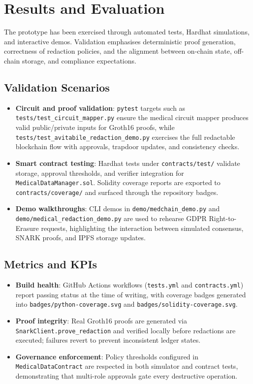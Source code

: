 \section{Results and Evaluation}

The prototype has been exercised through automated tests, Hardhat simulations, and interactive demos. Validation emphasises deterministic proof generation, correctness of redaction policies, and the alignment between on-chain state, off-chain storage, and compliance expectations.

\subsection{Validation Scenarios}
\begin{itemize}
    \item \textbf{Circuit and proof validation}: \texttt{pytest} targets such as \texttt{tests/test\_circuit\_mapper.py} ensure the medical circuit mapper produces valid public/private inputs for Groth16 proofs, while \texttt{tests/test\_avitabile\_redaction\_demo.py} exercises the full redactable blockchain flow with approvals, trapdoor updates, and consistency checks.
    \item \textbf{Smart contract testing}: Hardhat tests under \texttt{contracts/test/} validate storage, approval thresholds, and verifier integration for \texttt{MedicalDataManager.sol}. Solidity coverage reports are exported to \texttt{contracts/coverage/} and surfaced through the repository badges.
    \item \textbf{Demo walkthroughs}: CLI demos in \texttt{demo/medchain\_demo.py} and \texttt{demo/medical\_redaction\_demo.py} are used to rehearse GDPR Right-to-Erasure requests, highlighting the interaction between simulated consensus, SNARK proofs, and IPFS storage updates.
\end{itemize}

\subsection{Metrics and KPIs}
\begin{itemize}
    \item \textbf{Build health}: GitHub Actions workflows (\texttt{tests.yml} and \texttt{contracts.yml}) report passing status at the time of writing, with coverage badges generated into \texttt{badges/python-coverage.svg} and \texttt{badges/solidity-coverage.svg}.
    \item \textbf{Proof integrity}: Real Groth16 proofs are generated via \texttt{SnarkClient.prove\_redaction} and verified locally before redactions are executed; failures revert to prevent inconsistent ledger states.
    \item \textbf{Governance enforcement}: Policy thresholds configured in \texttt{MedicalDataContract} are respected in both simulator and contract tests, demonstrating that multi-role approvals gate every destructive operation.
\end{itemize}

